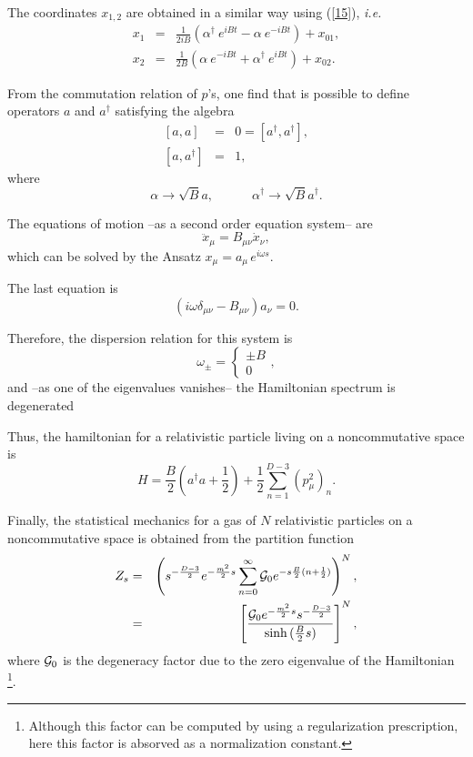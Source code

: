 \documentclass[a4paper,aps,twocolumn,amsfonts]{revtex4}
\begin{document}
   The coordinates $x_ {1,2}$ are obtained in a similar way using (\ref{15}), {\it i.e.}
   \begin{eqnarray}
   x_1 &=& \frac{1}{2 i B} \left(\alpha^\dag~ e^{ i B t} -\alpha~ e^{- i B t}  \right) + x_{01}, \nonumber
   \\
   x_2 &=& \frac{1}{2  B} \left( \alpha~ e^{- i B t} + \alpha^\dag~ e^{ i B t} \right)+ x_{02}. \label{17}
   \end{eqnarray}

   From the commutation relation of $p$'s, one find that is possible to define  operators $a$ and $a^{\dagger}$ satisfying the algebra
   \begin{eqnarray}
   \left[a, a \right] &=& 0=\left[a^\dag, a^\dag \right], \nonumber
   \\
   \left[a, a^\dag \right] &=& 1 \label{18},
   \end{eqnarray}
   where
   \[
   \alpha \rightarrow \sqrt{B} a,\,\,\,\,\,\,\,\,\,\,\,\,\,\,\,\,\,\, \alpha^{\dag}
   \rightarrow \sqrt{B}a^{\dag}.
   \]

   The equations of motion --as a second order equation system-- are
   \[
   \ddot{x}_\mu=B_{\mu\nu}\dot{x}_\nu,
   \]
   which can be solved by the Ansatz $x_\mu = a_\mu \,e^{i\omega s}$.

   The last equation is
   \[
   (i\omega\delta_{\mu\nu} -B_{\mu\nu})a_\nu=0.
   \]

   Therefore, the dispersion relation for this system is
   \begin{equation}
   \omega_{\pm}=\left\{
   \begin{array}{c}
   \pm B \\
   0
   \end{array}
   \right. , \label{dis}
   \end{equation}
   and --as one of the eigenvalues vanishes-- the Hamiltonian spectrum is degenerated

   Thus, the  hamiltonian for a relativistic particle living on a noncommutative space is
   \begin{equation}
   H=\frac{B}{2}\left( a^\dag a +\frac{1}{2}\right)
   +\frac{1}2\sum_{n=1}^{D-3}(p_\mu^2)_n.
   \label{23}
   \end{equation}

   Finally, the statistical mechanics for a gas of $N$ relativistic particles on a noncommutative space is obtained from the partition function
   \begin{eqnarray}
   Z_s&=&\left( s^{-\frac{D-3}{2}}e^{-\frac{m^2}{2}s} \sum_{n=0}^{\infty}
   {\cal G}_0 e^{-s\frac{B}{2}(n+\frac{
   1}{2})} \right)^N,\nonumber
   \\
   &=&\left[\frac{{\cal G}_0   e^{-\frac{m^2}{2}s}
   s^{-\frac{D-3}{2}}}{\sinh{(\frac{B}{2} s)}} \right]^N,
   \label{25}
   \end{eqnarray}
   where ${\cal G}_0$ is the degeneracy factor due to the zero eigenvalue of the Hamiltonian \footnote{Although this factor can be computed by using a regularization prescription, here this factor is absorved as a normalization constant.}.
\end{document}
